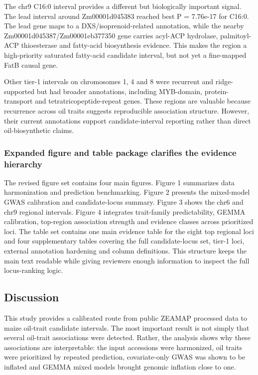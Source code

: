 \documentclass[
]{article}
\begin{document}
The chr9 C16:0 interval provides a different but biologically important
signal. The lead interval around Zm00001d045383 reached best P =
7.76e-17 for C16:0. The lead gene maps to a DXS/isoprenoid-related
annotation, while the nearby Zm00001d045387/Zm00001eb377350 gene carries
acyl-ACP hydrolase, palmitoyl-ACP thioesterase and fatty-acid
biosynthesis evidence. This makes the region a high-priority saturated
fatty-acid candidate interval, but not yet a fine-mapped FatB causal
gene.

Other tier-1 intervals on chromosomes 1, 4 and 8 were recurrent and
ridge-supported but had broader annotations, including MYB-domain,
protein-transport and tetratricopeptide-repeat genes. These regions are
valuable because recurrence across oil traits suggests reproducible
association structure. However, their current annotations support
candidate-interval reporting rather than direct oil-biosynthetic claims.

\subsubsection{Expanded figure and table package clarifies the evidence
hierarchy}\label{expanded-figure-and-table-package-clarifies-the-evidence-hierarchy}

The revised figure set contains four main figures. Figure 1 summarizes
data harmonization and prediction benchmarking. Figure 2 presents the
mixed-model GWAS calibration and candidate-locus summary. Figure 3 shows
the chr6 and chr9 regional intervals. Figure 4 integrates trait-family
predictability, GEMMA calibration, top-region association strength and
evidence classes across prioritized loci. The table set contains one
main evidence table for the eight top regional loci and four
supplementary tables covering the full candidate-locus set, tier-1 loci,
external annotation hardening and column definitions. This structure
keeps the main text readable while giving reviewers enough information
to inspect the full locus-ranking logic.

\subsection{Discussion}\label{discussion}

This study provides a calibrated route from public ZEAMAP processed data
to maize oil-trait candidate intervals. The most important result is not
simply that several oil-trait associations were detected. Rather, the
analysis shows why these associations are interpretable: the input
accessions were harmonized, oil traits were prioritized by repeated
prediction, covariate-only GWAS was shown to be inflated and GEMMA mixed
models brought genomic inflation close to one.
\end{document}
